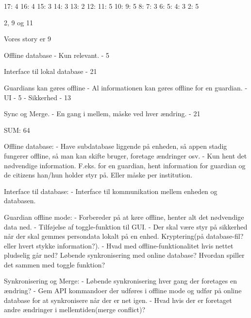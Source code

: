 17: 4
16: 4
15: 3
14: 3
13: 2
12: 
11: 5
10: 
9: 5
8: 
7: 3
6: 
5: 
4: 3
2: 5

2, 9 og 11

Vores story er 9


Offline database
-	Kun relevant.
	-	5

Interface til lokal database
	-	21

Guardians kan gøres offline
-	Al informationen kan gøres offline for en guardian.
- UI
    - 5
- Sikkerhed
    - 13

Sync og Merge.
-	En gang i mellem, måske ved hver ændring.
	-	21

SUM: 64




Offline database:
- Have subdatabase liggende på enheden, så appen stadig fungerer offline, så man kan skifte bruger, foretage ændringer osv.
- Kun hent det nødvendige information. F.eks. for en guardian, hent information for guardian og de citizens han/hun holder styr på. Eller måske per institution. 

Interface til database:
- Interface til kommunikation mellem enheden og databasen. 

Guardian offline mode:
- Forbereder på at køre offline, henter alt det nødvendige data ned.
- Tilføjelse af toggle-funktion til GUI.
- Der skal være styr på sikkerhed når der skal gemmes persondata lokalt på en enhed. Kryptering(på database-fil? eller hvert stykke information?).
- Hvad med offline-funktionalitet hvis nettet pludselig går ned? Løbende synkronisering med online database? Hvordan spiller det sammen med toggle funktion?

Synkronisering og Merge:
- Løbende synkronisering hver gang der foretages en ændring?
- Gem API kommandoer der udføres i offline mode og udfør på online database for at synkronisere når der er net igen.
- Hvad hvis der er foretaget andre ændringer i mellemtiden(merge conflict)?



